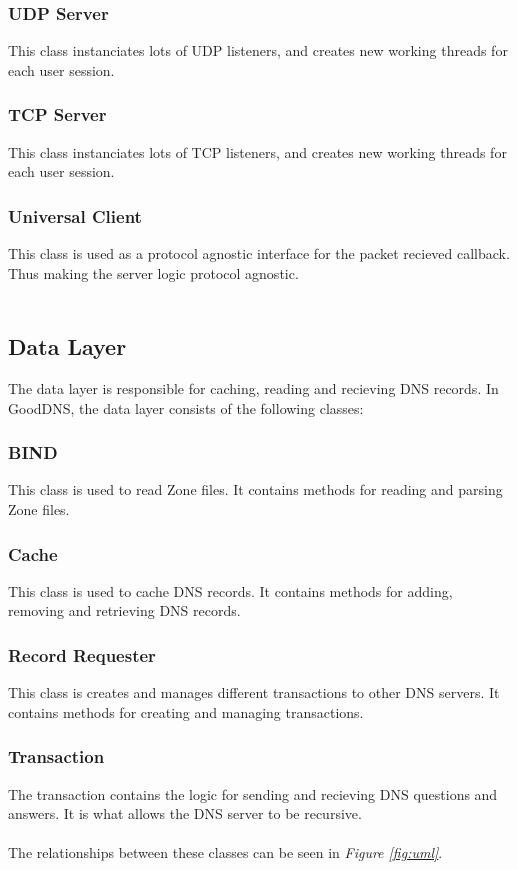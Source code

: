 \documentclass[12pt]{article}
\begin{document}
    \subsubsection{UDP Server}
    This class instanciates lots of UDP listeners, and creates new working threads for each user session.
    \subsubsection{TCP Server}
    This class instanciates lots of TCP listeners, and creates new working threads for each user session.
    \subsubsection{Universal Client}
    This class is used as a protocol agnostic interface for the packet recieved callback. Thus making the server logic protocol agnostic.
    \\
    \\
    \subsection{Data Layer}
    The data layer is responsible for caching, reading and recieving DNS records. In GoodDNS, the data layer consists of the following classes:
    \subsubsection{BIND}
    This class is used to read Zone\cite{ZoneFile2023} files. It contains methods for reading and parsing Zone files.
    \subsubsection{Cache}
    This class is used to cache DNS records. It contains methods for adding, removing and retrieving DNS records.
    \subsubsection{Record Requester}
    This class is creates and manages different transactions to other DNS servers. It contains methods for creating and managing transactions.
    \subsubsection{Transaction}
    The transaction contains the logic for sending and recieving DNS questions and answers. It is what allows the DNS server to be recursive.
    \\
    \\
    The relationships between these classes can be seen in \textit{Figure \ref{fig:uml}}.
    \\
    \\
\end{document}
